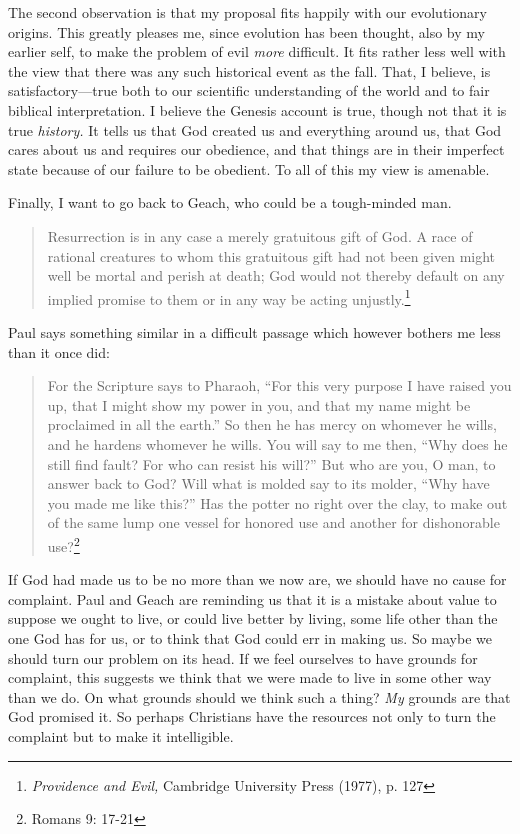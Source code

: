 \documentclass[11pt]{amsart}
\begin{document}
The second observation is that my proposal fits happily with our evolutionary origins. This greatly pleases me, since evolution has been thought, also by my earlier self, to make the problem of evil \emph{more} difficult. It fits rather less well with the view that there was any such historical event as the fall. That, I believe, is satisfactory---true both to our scientific understanding of the world and to fair biblical interpretation. I believe the Genesis account is true, though not that it is true \emph{history.} It tells us that God created us and everything around us, that God cares about us and requires our obedience, and that things are in their imperfect state because of our failure to be obedient. To all of this my view is amenable.


Finally, I want to go back to Geach, who could be a tough-minded man.\begin{quote}\small{Resurrection is in any case a merely gratuitous gift of God. A race of rational creatures to whom this gratuitous gift had not been given might well be mortal and perish at death; God would not thereby default on any implied promise to them or in any way be acting unjustly.}\footnote{\emph{Providence and Evil,} Cambridge University Press (1977), p. 127}\end{quote}Paul says something similar in a difficult passage which however bothers me less than it once did:\begin{quote}\small{For the Scripture says to Pharaoh, ``For this very purpose I have raised you up, that I might show my power in you, and that my name might be proclaimed in all the earth.''  So then he has mercy on whomever he wills, and he hardens whomever he wills. You will say to me then, ``Why does he still find fault? For who can resist his will?'' But who are you, O man, to answer back to God? Will what is molded say to its molder, ``Why have you made me like this?'' Has the potter no right over the clay, to make out of the same lump one vessel for honored use and another for dishonorable use?\footnote{Romans 9: 17-21}}\end{quote} If God had made us to be no more than we now are, we should have no cause for complaint. Paul and Geach are reminding us that it is a mistake about value to suppose we ought to live, or could live better by living, some life other than the one God has for us, or to think that God could err in making us. So maybe we should turn our problem on its head. If we feel ourselves to have grounds for complaint, this suggests we think that we were made to live in some other way than we do. On what grounds should we think such a thing? \emph{My} grounds are that God promised it. So perhaps Christians have the resources not only to turn the complaint but to make it intelligible.
\end{document}
